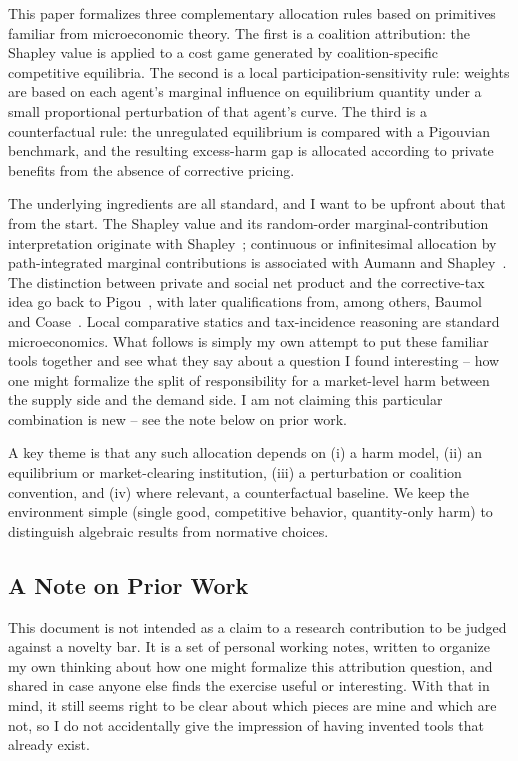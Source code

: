 \documentclass[journal, a4paper]{IEEEtran}
\begin{document}
This paper formalizes three complementary allocation rules based on primitives familiar from microeconomic theory. The first is a coalition attribution: the Shapley value is applied to a cost game generated by coalition-specific competitive equilibria. The second is a local participation-sensitivity rule: weights are based on each agent's marginal influence on equilibrium quantity under a small proportional perturbation of that agent's curve. The third is a counterfactual rule: the unregulated equilibrium is compared with a Pigouvian benchmark, and the resulting excess-harm gap is allocated according to private benefits from the absence of corrective pricing.

The underlying ingredients are all standard, and I want to be upfront about that from the start. The Shapley value and its random-order marginal-contribution interpretation originate with Shapley~\cite{Shapley1953}; continuous or infinitesimal allocation by path-integrated marginal contributions is associated with Aumann and Shapley~\cite{AumannShapley1974}. The distinction between private and social net product and the corrective-tax idea go back to Pigou~\cite{Pigou1932}, with later qualifications from, among others, Baumol~\cite{Baumol1972} and Coase~\cite{Coase1960}. Local comparative statics and tax-incidence reasoning are standard microeconomics. What follows is simply my own attempt to put these familiar tools together and see what they say about a question I found interesting -- how one might formalize the split of responsibility for a market-level harm between the supply side and the demand side. I am not claiming this particular combination is new -- see the note below on prior work.

A key theme is that any such allocation depends on (i) a harm model, (ii) an equilibrium or market-clearing institution, (iii) a perturbation or coalition convention, and (iv) where relevant, a counterfactual baseline. We keep the environment simple (single good, competitive behavior, quantity-only harm) to distinguish algebraic results from normative choices.


\subsection{A Note on Prior Work}
\label{sec:prior_work}
This document is not intended as a claim to a research contribution to be judged against a novelty bar. It is a set of personal working notes, written to organize my own thinking about how one might formalize this attribution question, and shared in case anyone else finds the exercise useful or interesting. With that in mind, it still seems right to be clear about which pieces are mine and which are not, so I do not accidentally give the impression of having invented tools that already exist.
\end{document}

